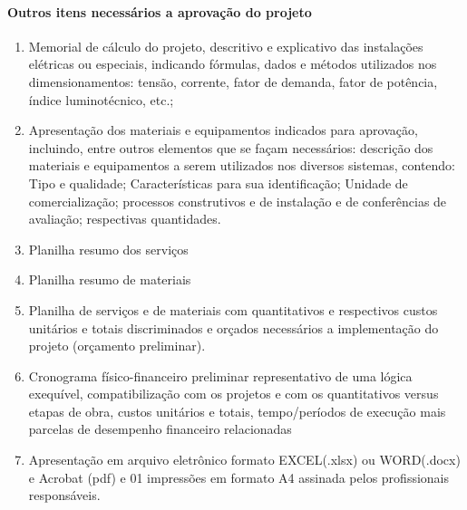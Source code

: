 \paragraph{Outros itens necessários a aprovação do projeto}
\begin{enumerate}
	\item Memorial de cálculo do projeto, descritivo e explicativo das instalações elétricas ou especiais, indicando fórmulas, dados e métodos utilizados nos dimensionamentos: tensão, corrente, fator de demanda, fator de potência, índice luminotécnico, etc.;
	
	\item Apresentação dos materiais e equipamentos indicados para aprovação, incluindo, entre outros elementos que se façam necessários: descrição dos materiais e equipamentos a serem utilizados nos diversos sistemas, contendo: Tipo e qualidade; Características para sua identificação; Unidade de comercialização; processos construtivos e de instalação e de conferências de avaliação; respectivas quantidades.
	
	\item Planilha resumo dos serviços
	
	\item Planilha resumo de materiais
	
	\item Planilha de serviços e de materiais com quantitativos e respectivos custos unitários e totais discriminados e orçados necessários a implementação do projeto (orçamento preliminar).
	
	\item Cronograma físico-financeiro preliminar representativo de uma lógica exequível, compatibilização com os projetos e com os quantitativos versus etapas de obra, custos unitários e totais, tempo/períodos de execução mais parcelas de desempenho financeiro relacionadas
	
	\item Apresentação em arquivo eletrônico formato EXCEL(.xlsx) ou WORD(.docx) e Acrobat (pdf) e 01 impressões em formato A4 assinada pelos profissionais responsáveis.
	
\end{enumerate}
